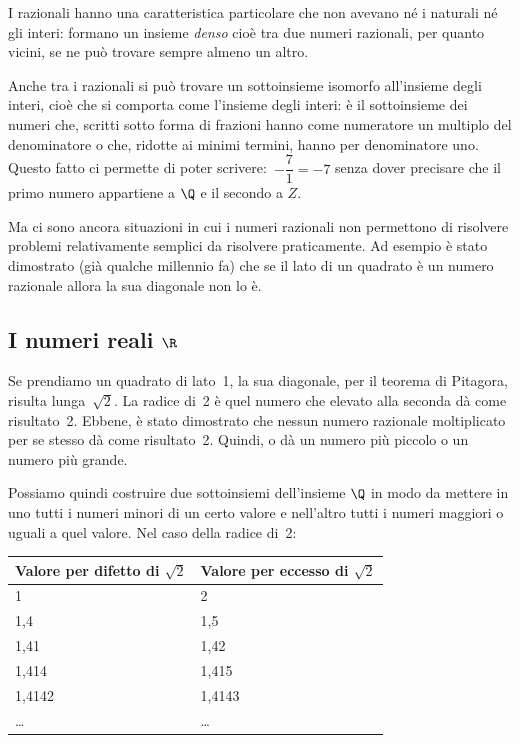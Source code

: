 I razionali hanno una caratteristica particolare che non avevano né i 
naturali né gli interi: formano un insieme \emph{denso} cioè tra due numeri 
razionali, per quanto vicini, se ne può trovare sempre almeno un altro.

Anche tra i razionali si può trovare un sottoinsieme isomorfo all'insieme 
degli interi, cioè che si comporta come l'insieme degli interi: è il 
sottoinsieme dei numeri che, scritti sotto forma di frazioni hanno come 
numeratore un multiplo del denominatore o che, ridotte ai minimi termini, 
hanno per denominatore uno. 
Questo fatto ci permette di poter scrivere:~\(-\dfrac{7}{1} = -7\) 
senza dover precisare che il primo numero appartiene a \(\Q\) e il secondo 
a \(Z\).

Ma ci sono ancora situazioni in cui i numeri razionali non permettono di 
risolvere problemi relativamente semplici da risolvere praticamente. 
Ad esempio è stato dimostrato (già qualche millennio fa) che se il lato di 
un quadrato è un numero razionale allora la sua diagonale non lo è. 

\subsection{I numeri reali $\R$}
\label{subsec:insnum_reali}

Se prendiamo un quadrato di lato~1, la sua diagonale, per il teorema di 
Pitagora, risulta lunga~$\sqrt{2}$. 
La radice di~2 è quel numero che elevato alla seconda dà come risultato~2.
Ebbene, è stato dimostrato che nessun numero razionale moltiplicato per se 
stesso dà come risultato~2. 
Quindi, o dà un numero più piccolo o un numero più grande.

Possiamo quindi costruire due sottoinsiemi dell'insieme $\Q$ in modo da 
mettere in uno tutti i numeri minori di un certo valore e nell'altro tutti 
i 
numeri maggiori o uguali a quel valore. Nel caso della radice di~2:

\begin{center}
 \begin{tabular}{ll}
\toprule
Valore per difetto di $\sqrt{2}$ &Valore per eccesso di $\sqrt{2}$ \\
\midrule
1& 2\\
1,4& 1,5 \\
1,41& 1,42\\
1,414& 1,415\\
1,4142& 1,4143\\
\ldots& \ldots\\
\bottomrule
\end{tabular}
\end{center}

